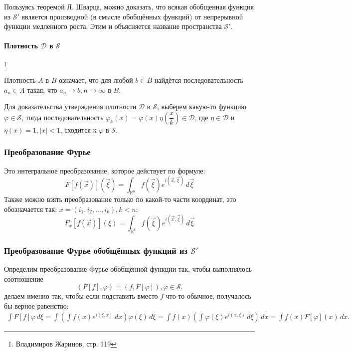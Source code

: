 Пользуясь теоремой Л. Шварца, можно доказать, что всякая обобщенная функция из $\mathcal{S}'$
является производной (в смысле обобщённых функций) от непрерывной функции медленного роста. Этим и
объясняется название пространства $\mathcal{S}'$.

\paragraph{Плотность $\mathcal{D}$ в $\mathcal{S}$}\footnote{Владимиров Жаринов, стр. 119}

Плотность $A$ в $B$ означает, что для любой $b \in B$ найдётся последовательность $a_n \in A$ такая,
что $a_n \to b, n \to \infty$ в $B$.

Для доказательства утверждения плотности $\mathcal{D}$ в $\mathcal{S}$, выберем какую-то функцию
$\varphi \in \mathcal{S}$, тогда последовательность
$\varphi_k(x) = \varphi(x) \eta(\dfrac{x}{k}) \in \mathcal{D}$, где $\eta \in \mathcal{D}$ и
$\eta(x) = 1, |x| < 1$, сходится к $\varphi$ в $\mathcal{S}$.

\subsubsection{Преобразование Фурье}

Это интегральное преобразование, которое действует по формуле:
\[
  F[f(\vec{x})](\vec{\xi}) = \int_{\mathbb{R}^n} f(\vec{\xi}) e^{i (\vec{x},\vec{\xi})} \, d\vec{\xi}
\]
Также можно взять преобразование только по какой-то части координат, это обозначается так:
$x = (i_1, i_2, \dots, i_k), k < n$:
\[
  F_x [f(\vec{x})] (\xi) = \int_{\mathbb{R}^k} f(\vec{\xi}) e^{i (\vec{x}, \vec{\xi})} \, d\vec{\xi}
\]

\subsubsection{Преобразование Фурье обобщённых функций из $\mathcal{S}'$}

Определим преобразование Фурье обобщённой функции так, чтобы выполнялось соотношение
\[
  (F[f], \varphi) = (f, F[\varphi]), \varphi \in \mathcal{S}.
\]
делаем именно так, чтобы если подставить вместо $f$ что-то обычное, получалось бы верное равенство:
\begin{multline*}
  \int F[f] \varphi \, d\xi
  = \int \left( \int f(x) e^{i (\xi, x)} \, dx \right) \varphi(\xi) \, d\xi
  = \int f(x) \left( \int \varphi(\xi) e^{i (x, \xi)} \, d\xi \right) \, dx
  = \int f(x) F[\varphi](x) \, dx.
\end{multline*}


